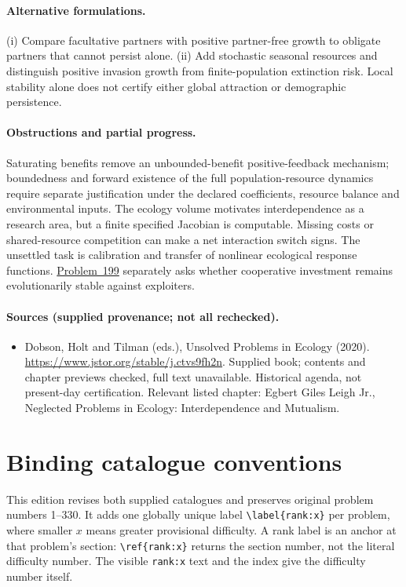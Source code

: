 \documentclass[11pt]{article}
\begin{document}
\paragraph{Alternative formulations.} (i) Compare facultative partners with positive partner-free growth to obligate partners that cannot persist alone. (ii) Add stochastic seasonal resources and distinguish positive invasion growth from finite-population extinction risk. Local stability alone does not certify either global attraction or demographic persistence.
\paragraph{Obstructions and partial progress.} Saturating benefits remove an unbounded-benefit positive-feedback mechanism; boundedness and forward existence of the full population-resource dynamics require separate justification under the declared coefficients, resource balance and environmental inputs. The ecology volume motivates interdependence as a research area, but a finite specified Jacobian is computable. Missing costs or shared-resource competition can make a net interaction switch signs. The unsettled task is calibration and transfer of nonlinear ecological response functions. \href{https://we-solve.github.io/problems/ecology-of-cooperation-across-species-f0e574a0/}{Problem~199} separately asks whether cooperative investment remains evolutionarily stable against exploiters.
\paragraph{Sources (supplied provenance; not all rechecked).}
\begin{itemize}
\item Dobson, Holt and Tilman (eds.), Unsolved Problems in Ecology (2020). \url{https://www.jstor.org/stable/j.ctvs9fh2n}. Supplied book; contents and chapter previews checked, full text unavailable. Historical agenda, not present-day certification. Relevant listed chapter: Egbert Giles Leigh Jr., Neglected Problems in Ecology: Interdependence and Mutualism.
\end{itemize}


\section*{Binding catalogue conventions}
This edition revises both supplied catalogues and preserves original problem numbers 1--330. It adds one globally unique label \verb|\label{rank:x}| per problem, where smaller $x$ means greater provisional difficulty. A rank label is an anchor at that problem's section: \verb|\ref{rank:x}| returns the section number, not the literal difficulty number. The visible \texttt{rank:x} text and the index give the difficulty number itself.
\end{document}
